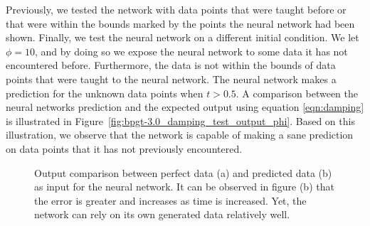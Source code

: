 \documentclass[11pt]{article}
\begin{document}
Previously, we tested the network with data points that were taught before or that were within the bounds marked by the points the
neural network had been shown. Finally, we test the neural network on a different initial condition. We let $\phi=10$, and by doing so
we expose the neural network to some data it has not encountered before. Furthermore, the data is not within the bounds of data points
that were taught to the neural network. The neural network makes a prediction for the unknown data points when $t > 0.5$. A comparison
between the neural networks prediction and the expected output using equation \ref{eqn:damping} is illustrated in
Figure~\ref{fig:bpgt-3.0_damping_test_output_phi}. Based on this illustration, we observe that the network is capable of making a sane prediction on data points that it has not previously encountered.

\begin{figure}[]
	\centering
		\caption{Output comparison between perfect data (a) and predicted data (b) as input for the neural network. It can be observed in figure (b) that the error is greater and increases as time is increased. Yet, the network can rely on its own generated data relatively well.}
	\label{fig:bpgt-3.0_damping_test_output_comp}	
\end{figure}
\end{document}
